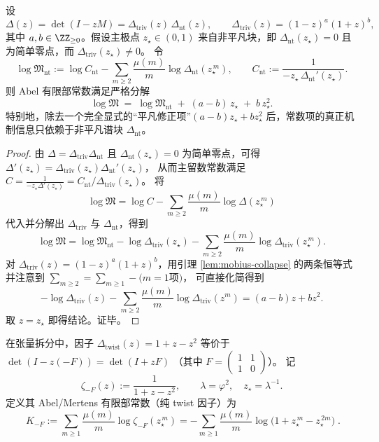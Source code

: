 \begin{proposition}\label{prop:real-input-40-reduced-mertens}
设
\[
\Delta(z)=\det(I-zM)=\Delta_{\mathrm{triv}}(z)\,\Delta_{\mathrm{nt}}(z),
\qquad
\Delta_{\mathrm{triv}}(z)=(1-z)^a(1+z)^b,
\]
其中 $a,b\in\ZZ_{\ge 0}$。假设主极点 $z_\star\in(0,1)$ 来自非平凡块，即 $\Delta_{\mathrm{nt}}(z_\star)=0$ 且为简单零点，而 $\Delta_{\mathrm{triv}}(z_\star)\neq 0$。
令
\[
\log\mathfrak{M}_{\mathrm{nt}}
:=\log C_{\mathrm{nt}}-\sum_{m\ge 2}\frac{\mu(m)}{m}\log \Delta_{\mathrm{nt}}(z_\star^{\,m}),
\qquad
C_{\mathrm{nt}}:=\frac{1}{-z_\star\,\Delta_{\mathrm{nt}}'(z_\star)}.
\]
则 Abel 有限部常数满足严格分解
\[
\boxed{\;
\log\mathfrak{M}
\;=\;
\log\mathfrak{M}_{\mathrm{nt}}
\;+\;
(a-b)\,z_\star
\;+\;
b\,z_\star^2.
\;}
\]
特别地，除去一个完全显式的“平凡修正项”\((a-b)z_\star+bz_\star^2\) 后，常数项的真正机制信息只依赖于非平凡谱块 $\Delta_{\mathrm{nt}}$。
\end{proposition}
\begin{proof}
由 $\Delta=\Delta_{\mathrm{triv}}\Delta_{\mathrm{nt}}$ 且 $\Delta_{\mathrm{nt}}(z_\star)=0$ 为简单零点，可得
\(
\Delta'(z_\star)=\Delta_{\mathrm{triv}}(z_\star)\Delta_{\mathrm{nt}}'(z_\star)
\)，
从而主留数常数满足
\(
C=\frac{1}{-z_\star\Delta'(z_\star)}=C_{\mathrm{nt}}/\Delta_{\mathrm{triv}}(z_\star)
\)。
将
\[
\log\mathfrak{M}=\log C-\sum_{m\ge 2}\frac{\mu(m)}{m}\log\Delta(z_\star^{\,m})
\]
代入并分解出 $\Delta_{\mathrm{triv}}$ 与 $\Delta_{\mathrm{nt}}$，得到
\[
\log\mathfrak{M}
=\log\mathfrak{M}_{\mathrm{nt}}
-\log\Delta_{\mathrm{triv}}(z_\star)
-\sum_{m\ge 2}\frac{\mu(m)}{m}\log\Delta_{\mathrm{triv}}(z_\star^{\,m}).
\]
对 $\Delta_{\mathrm{triv}}(z)=(1-z)^a(1+z)^b$，用引理 \ref{lem:mobius-collapse} 的两条恒等式并注意到
\(
\sum_{m\ge 2}=\sum_{m\ge 1}-\text{(}m=1\text{项)}
\)，
可直接化简得到
\[
-\log\Delta_{\mathrm{triv}}(z)-\sum_{m\ge 2}\frac{\mu(m)}{m}\log\Delta_{\mathrm{triv}}(z^{m})
=(a-b)z+bz^2.
\]
取 $z=z_\star$ 即得结论。证毕。
\end{proof}

\begin{definition}\label{def:real-input-40-artin-sign-mertens}
在张量拆分中，因子
\(
\Delta_{\mathrm{twist}}(z)=1+z-z^2
\)
等价于
\(
\det(I-z(-F))=\det(I+zF)
\)
（其中 \(F=\begin{pmatrix}1&1\\1&0\end{pmatrix}\)）。
记
\[
\zeta_{-F}(z):=\frac{1}{1+z-z^2},
\qquad
\lambda=\varphi^2,\quad z_\star=\lambda^{-1}.
\]
定义其 Abel/Mertens 有限部常数（纯 twist 因子）为
\[
\boxed{\;
K_{-F}
:=\sum_{m\ge 1}\frac{\mu(m)}{m}\log\zeta_{-F}(z_\star^{\,m})
=-\sum_{m\ge 1}\frac{\mu(m)}{m}\log\!\bigl(1+z_\star^{\,m}-z_\star^{\,2m}\bigr)\; }.
\]
\end{definition}

